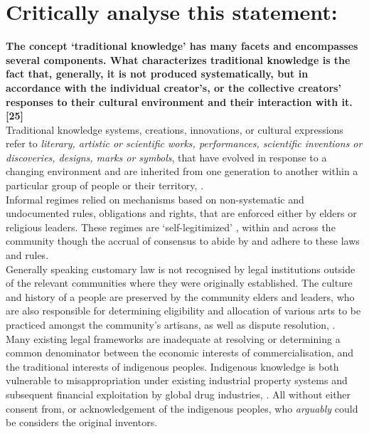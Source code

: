 \documentclass[11pt]{article}
\begin{document}
\section{Critically analyse this statement:}
\label{sec:org24862d9}

\textbf{The concept `traditional knowledge' has many facets and encompasses several components. What characterizes traditional knowledge is the fact that, generally, it is not produced systematically, but in accordance with the individual creator's, or the collective creators' responses to their cultural environment and their interaction with it. [25]}\\

Traditional knowledge systems, creations, innovations, or cultural expressions
refer to \emph{literary, artistic or scientific works, performances, scientific
inventions or discoveries, designs, marks or symbols}, that have evolved in
response to a changing environment and are inherited from one generation to
another within a particular group of people or their territory,
\cite{geyer10_towards_clearer_defin_underst_indi}.\\

Informal regimes relied on mechanisms based on non-systematic and undocumented
rules, obligations and rights, that are enforced either by elders or religious
leaders. These regimes are `self-legitimized'
\cite{amechi15_leverag_trad_knowl_medicinal}, within and across the community
though the accrual of consensus to abide by and adhere to these laws and
rules.\\

Generally speaking customary law is not recognised by legal institutions outside
of the relevant communities where they were originally established. The culture
and history of a people are preserved by the community elders and leaders, who
are also responsible for determining eligibility and allocation of various arts
to be practiced amongst the community's artisans, as well as dispute
resolution, \cite{geyer10_towards_clearer_defin_underst_indi}.\\

Many existing legal frameworks are inadequate at resolving or determining a
common denominator between the economic interests of commercialisation, and the
traditional interests of indigenous peoples. Indigenous knowledge is both
vulnerable to misappropriation under existing industrial property systems and
subsequent financial exploitation by global drug industries,
\cite{masango10_indigenous_trad_knowl_protect_prospects}. All without either
consent from, or acknowledgement of the indigenous peoples, who \emph{arguably} could
be considers the original inventors.\\
\end{document}
